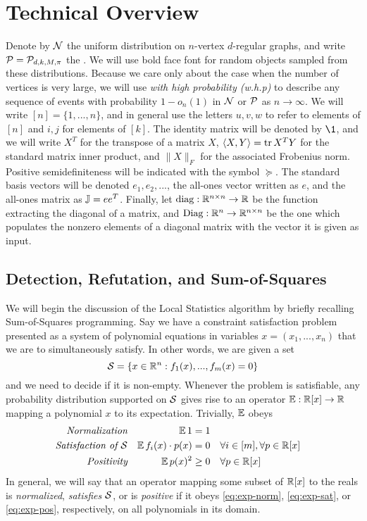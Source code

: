 \section{Technical Overview} 
\label{sec:technical}

Denote by $\mathcal{N}$ the uniform distribution on $n$-vertex $d$-regular graphs, and write $\mathcal{P} = \mathcal{P}_{d,k,M,\pi}$ the \model. We will use bold face font for random objects sampled from these distributions. Because we care only about the case when the number of vertices is very large, we will use \emph{with high probability (w.h.p)} to describe any sequence of events with probability $1 - o_n(1)$ in $\mathcal{N}$ or $\mathcal{P}$ as $n\to \infty$. We will write $[n] = \{1,...,n\}$, and in general use the letters $u,v,w$ to refer to elements of $[n]$ and $i,j$ for elements of $[k]$. The identity matrix will be denoted by $\1$, and we will write $X^T$ for the transpose of a matrix $X$, $\langle X,Y \rangle = \operatorname{tr} X^TY$ for the standard matrix inner product, and $\|X\|_F$ for the associated Frobenius norm. Positive semidefiniteness  will be indicated with the symbol $\succeq$. The standard basis vectors will be denoted $e_1,e_2,...$, the all-ones vector written as $e$, and the all-ones matrix as $\mathbb{J} = ee^T$. Finally, let $\operatorname{diag} : \mathbb{R}^{n\times n} \to \mathbb{R}$ be the function extracting the diagonal of a matrix, and $\operatorname{Diag}: \mathbb{R}^n \to \mathbb{R}^{n\times n}$ be the one which populates the nonzero elements of a diagonal matrix with the vector it is given as input.

\subsection{Detection, Refutation, and Sum-of-Squares} %
\label{sub:detection_refutation_and_sum_of_squares}

We will begin the discussion of the Local Statistics algorithm by briefly recalling Sum-of-Squares programming. Say we have a constraint satisfaction problem presented as a system of polynomial equations in variables $x = (x_1,...,x_n)$ that we are to simultaneously satisfy. In other words, we are given a set
$$
	\mathcal{S} = \left\{ x \in \mathbb{R}^n : f_1(x),...,f_m(x) = 0\right\}
$$
and we need to decide if it is non-empty. Whenever the problem is satisfiable, any probability distribution supported on $\mathcal{S}$ gives rise to an operator $\operatorname*{\mathbb{E}}: \mathbb{R}[x] \to \mathbb{R}$ mapping a polynomial $x$ to its expectation. Trivially, $\operatorname*{\mathbb{E}}$ obeys
\begin{align}
	\textit{Normalization} & &\operatorname*{\mathbb{E}} 1 &= 1 \label{eq:exp-norm} \\
	\textit{Satisfaction of $\mathcal{S}$}& & \operatorname*{\mathbb{E}} f_i(x)\cdot p(x) &= 0 & &\forall i\in[m], \forall p \in\mathbb{R}[x] \label{eq:exp-sat}\\
	\textit{Positivity} & & \operatorname*{\mathbb{E}} p(x)^2 &\ge 0 & &\forall p \in \mathbb{R}[x] \label{eq:exp-pos} 
\end{align}
In general, we will say that an operator mapping some subset of $\mathbb{R}[x]$ to the reals is \emph{normalized}, \emph{satisfies $\mathcal{S}$}, or is \emph{positive} if it obeys \eqref{eq:exp-norm}, \eqref{eq:exp-sat}, or \eqref{eq:exp-pos}, respectively, on all polynomials in its domain.

